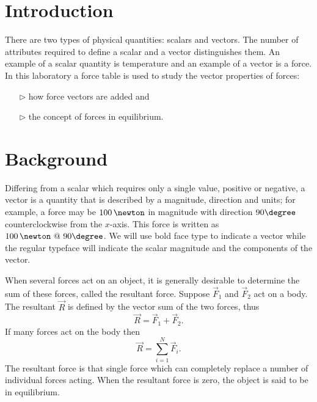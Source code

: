 
\label{lab:M0}

\section*{Introduction}

There are two types of physical quantities: scalars and vectors.  The number of attributes required to define a scalar and a vector distinguishes them.
An example of a scalar quantity is temperature and an example of a vector is a force.
In this laboratory a force table is used to study the vector properties of forces:
\begin{enumerate}
\item[$\triangleright$] how force vectors are added and
\item[$\triangleright$] the concept of forces in equilibrium.
\end{enumerate}













\section{Background}

Differing from a scalar which requires only a single value, positive or negative, a vector is a quantity that is described by a magnitude, direction and units; for example, a force may be $100\,\newton$ in magnitude with direction $90\degree$ counterclockwise from the $x$-axis.   This force is written as $100\,\newton \ @ \ 90\degree$. We will use bold face type to indicate a vector while the regular typeface will indicate the scalar magnitude and the components of the vector.

When several forces act on an object, it is generally desirable to determine the sum of these forces, called the resultant force.  Suppose $\vec{F}_1$ and $\vec{F}_2$ act on a body. The resultant $\vec{R}$ is defined by the vector sum of the two forces, thus
\begin{equation}
   \vec{R} = \vec{F}_1 + \vec{F}_2.
\end{equation}
If many forces act on the body then
\begin{equation}
  \vec{R} = \sum_{i=1}^N \vec{F}_i.
\end{equation}
The resultant force is that single force which can completely replace a number of individual forces acting.  When the resultant force is zero, the object is said to be in equilibrium.

